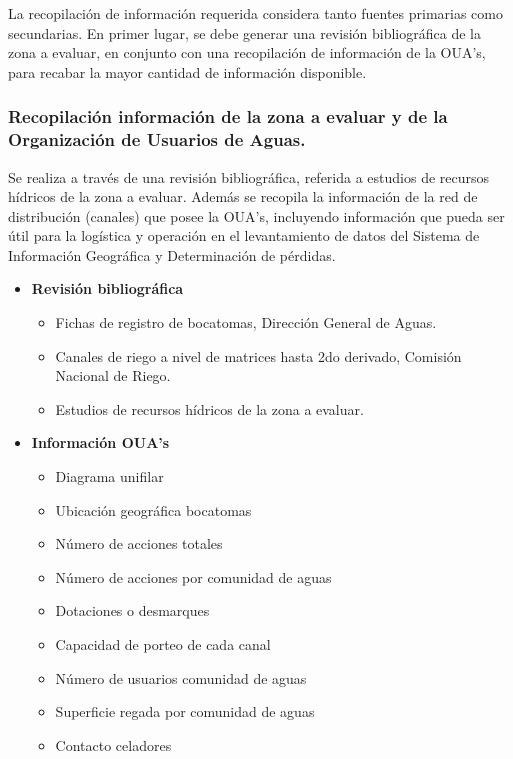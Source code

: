 \documentclass[]{article}
\begin{document}
La recopilación de información requerida considera tanto fuentes primarias como secundarias. En primer lugar, se debe generar una revisión bibliográfica de la zona a evaluar, en conjunto con una recopilación de información de la OUA's, para recabar la mayor cantidad de información disponible.

\subsubsection{Recopilación información de la zona a evaluar y de la Organización de Usuarios de Aguas.}

Se realiza a través de una revisión bibliográfica, referida a estudios de recursos hídricos de la zona a evaluar. Además se recopila la información de la red de distribución (canales) que posee la OUA's, incluyendo información que pueda ser útil para la logística y operación en el levantamiento de datos del Sistema de Información Geográfica y Determinación de pérdidas.

\begin{itemize}
	\item \textbf{Revisión bibliográfica}
	\begin{itemize}	
		\item Fichas de registro de bocatomas, Dirección General de Aguas.
		\item Canales de riego a nivel de matrices hasta 2do derivado, Comisión Nacional de Riego.
		\item Estudios de recursos hídricos de la zona a evaluar.
	\end{itemize}
	\item \textbf{Información OUA's}
	\begin{itemize}	
		\item Diagrama unifilar
		\item Ubicación geográfica bocatomas
		\item Número de acciones totales
		\item Número de acciones por comunidad de aguas
		\item Dotaciones o desmarques
		\item Capacidad de porteo de cada canal
		\item Número de usuarios comunidad de aguas
		\item Superficie regada por comunidad de aguas
		\item Contacto celadores
	\end{itemize}
\end{itemize}	
\end{document}

